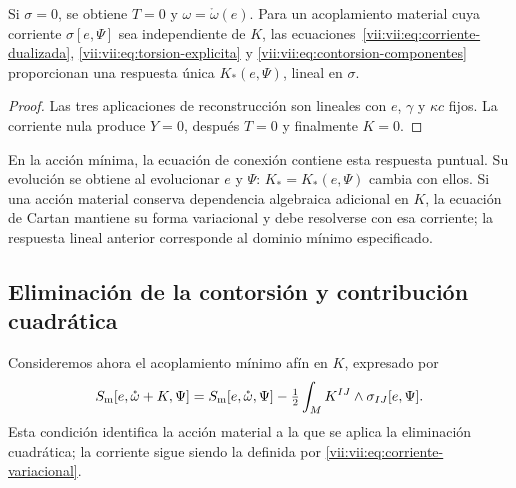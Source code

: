 \begin{corollary}
\label{vii:vii:cor:desacoplamiento-torsional}
Si \(\sigma=0\), se obtiene \(T=0\) y
\(\omega=\mathring\omega(e)\). Para un acoplamiento material cuya
corriente \(\sigma[e,\Psi]\) sea independiente de \(K\),
las ecuaciones~\eqref{vii:vii:eq:corriente-dualizada},
\eqref{vii:vii:eq:torsion-explicita} y
\eqref{vii:vii:eq:contorsion-componentes} proporcionan una respuesta única
\(K_*(e,\Psi)\), lineal en \(\sigma\).
\end{corollary}
\begin{proof}
Las tres aplicaciones de reconstrucción son lineales con \(e\),
\(\gamma\) y \(\kappa c\) fijos. La corriente nula produce
\(Y=0\), después \(T=0\) y finalmente \(K=0\).
\end{proof}

En la acción mínima, la ecuación de conexión contiene esta respuesta
puntual. Su evolución se obtiene al evolucionar \(e\) y \(\Psi\):
\(K_*=K_*(e,\Psi)\) cambia con ellos. Si una acción material conserva
dependencia algebraica adicional en \(K\), la ecuación de Cartan
mantiene su forma variacional y debe resolverse con esa corriente;
la respuesta lineal anterior corresponde al dominio mínimo especificado.

\subsection{Eliminación de la contorsión y contribución cuadrática}
\label{vii:vii:subsec:respuesta-cuadratica}

Consideremos ahora el acoplamiento mínimo afín en \(K\), expresado por
\begin{equation}
 S_{\rm m}[e,\mathring\omega+K,\Psi]
 =S_{\rm m}[e,\mathring\omega,\Psi]
   -\tfrac12\int_M K^{IJ}\wedge\sigma_{IJ}[e,\Psi].
 \label{vii:vii:eq:materia-afin-contorsion}
\end{equation}
Esta condición identifica la acción material a la que se aplica la
eliminación cuadrática; la corriente sigue siendo la definida por
\eqref{vii:vii:eq:corriente-variacional}.

